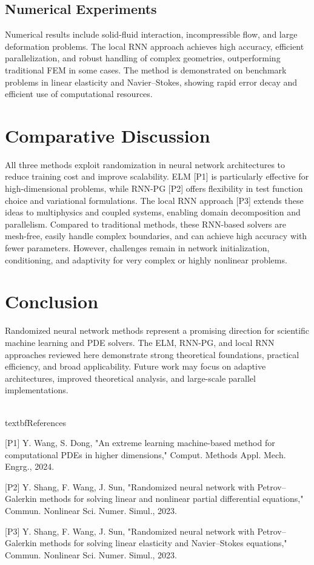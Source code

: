 \documentclass[12pt]{article}
\begin{document}
\subsection{Numerical Experiments}
Numerical results include solid-fluid interaction, incompressible flow, and large deformation problems. The local RNN approach achieves high accuracy, efficient parallelization, and robust handling of complex geometries, outperforming traditional FEM in some cases. The method is demonstrated on benchmark problems in linear elasticity and Navier–Stokes, showing rapid error decay and efficient use of computational resources.

\section{Comparative Discussion}
All three methods exploit randomization in neural network architectures to reduce training cost and improve scalability. ELM [P1] is particularly effective for high-dimensional problems, while RNN-PG [P2] offers flexibility in test function choice and variational formulations. The local RNN approach [P3] extends these ideas to multiphysics and coupled systems, enabling domain decomposition and parallelism. Compared to traditional methods, these RNN-based solvers are mesh-free, easily handle complex boundaries, and can achieve high accuracy with fewer parameters. However, challenges remain in network initialization, conditioning, and adaptivity for very complex or highly nonlinear problems.

\section{Conclusion}
Randomized neural network methods represent a promising direction for scientific machine learning and PDE solvers. The ELM, RNN-PG, and local RNN approaches reviewed here demonstrate strong theoretical foundations, practical efficiency, and broad applicability. Future work may focus on adaptive architectures, improved theoretical analysis, and large-scale parallel implementations.

\\textbf{References}

[P1] Y. Wang, S. Dong, "An extreme learning machine-based method for computational PDEs in higher dimensions," Comput. Methods Appl. Mech. Engrg., 2024.

[P2] Y. Shang, F. Wang, J. Sun, "Randomized neural network with Petrov–Galerkin methods for solving linear and nonlinear partial differential equations," Commun. Nonlinear Sci. Numer. Simul., 2023.

[P3] Y. Shang, F. Wang, J. Sun, "Randomized neural network with Petrov–Galerkin methods for solving linear elasticity and Navier–Stokes equations," Commun. Nonlinear Sci. Numer. Simul., 2023.
\end{document}
